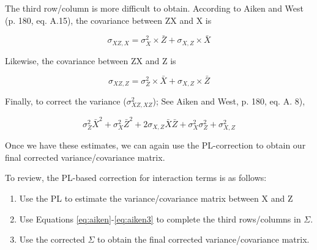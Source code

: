 \documentclass[man, babel,english]{apa}%
\begin{document}
The third row/column is more difficult to obtain. According to Aiken and West (p. 180, eq. A.15), the covariance between ZX and X is

\begin{equation}
\sigma_{XZ,X} = \sigma^2_X \times \bar{Z} + \sigma_{X,Z}\times\bar{X}
\label{eq:aiken}
\end{equation}


Likewise, the covariance between ZX and Z is

\begin{equation}
\sigma_{XZ,Z} = \sigma^2_Z \times \bar{X} + \sigma_{X,Z}\times\bar{Z}
\label{eq:aiken2}
\end{equation}


Finally, to correct the variance ($\sigma^2_{XZ,XZ}$); See Aiken and West, p. 180, eq. A. 8),

\begin{equation}
\sigma^2_Z\bar{X}^2 + \sigma^2_X\bar{Z}^2 + 2\sigma_{X,Z}\bar{X}\bar{Z} + \sigma^2_X\sigma^2_Z + \sigma^2_{X,Z}
\label{eq:aiken3}
\end{equation}


Once we have these estimates, we can again use the PL-correction to obtain our final corrected variance/covariance matrix. 

To review, the PL-based correction for interaction terms is as follows:

\begin{enumerate}
\item Use the PL to estimate the variance/covariance matrix between X and Z
\item Use Equations \ref{eq:aiken}-\ref{eq:aiken3} to complete the third rows/columns in $\Sigma$.
\item Use the corrected $\Sigma$ to obtain the final corrected variance/covariance matrix. 
\end{enumerate}
\end{document}
